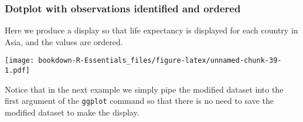 \documentclass[]{book}
\newenvironment{Shaded}{\begin{snugshade}}{\end{snugshade}}
\newcommand{\KeywordTok}[1]{\textcolor[rgb]{0.13,0.29,0.53}{\textbf{#1}}}
\newcommand{\DataTypeTok}[1]{\textcolor[rgb]{0.13,0.29,0.53}{#1}}
\newcommand{\DecValTok}[1]{\textcolor[rgb]{0.00,0.00,0.81}{#1}}
\newcommand{\StringTok}[1]{\textcolor[rgb]{0.31,0.60,0.02}{#1}}
\newcommand{\CommentTok}[1]{\textcolor[rgb]{0.56,0.35,0.01}{\textit{#1}}}
\newcommand{\OperatorTok}[1]{\textcolor[rgb]{0.81,0.36,0.00}{\textbf{#1}}}
\newcommand{\NormalTok}[1]{#1}
\begin{document}
\subsubsection{Dotplot with observations identified and
ordered}\label{dotplot-with-observations-identified-and-ordered}

Here we produce a display so that life expectancy is displayed for each
country in Asia, and the values are ordered.

\begin{Shaded}
\end{Shaded}

\texttt{[image: bookdown-R-Essentials\_files/figure-latex/unnamed-chunk-39-1.pdf]}

Notice that in the next example we simply pipe the modified dataset into
the first argument of the \texttt{ggplot} command so that there is no
need to save the modified dataset to make the display.

\begin{Shaded}
\end{Shaded}
\end{document}
